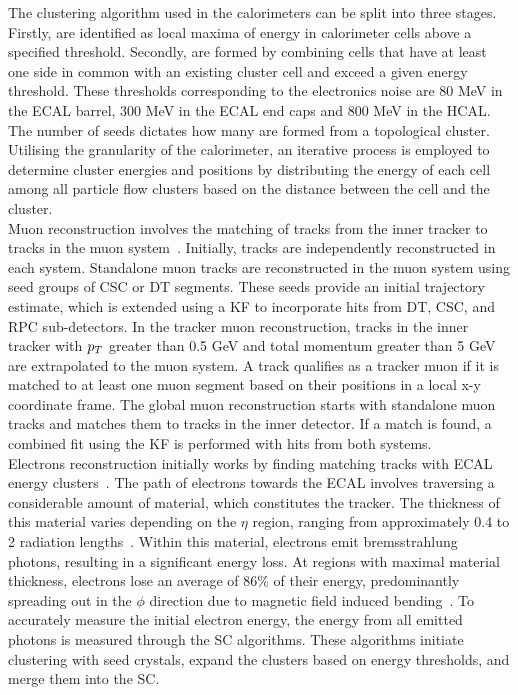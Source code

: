 The clustering algorithm used in the calorimeters can be split into three stages. 
Firstly,  are identified as local maxima of energy in calorimeter cells above a specified threshold. 
Secondly,  are formed by combining cells that have at least one side in common with an existing cluster cell and exceed a given energy threshold. 
These thresholds corresponding to the electronics noise are 80 MeV in the \ac{ECAL} barrel, 300 MeV in the \ac{ECAL} end caps and 800 MeV in the \ac{HCAL}. 
The number of seeds dictates how many  are formed from a topological cluster.
Utilising the granularity of the calorimeter, an iterative process is employed to determine cluster energies and positions by distributing the energy of each cell among all particle flow clusters based on the distance between the cell and the cluster. \\

Muon reconstruction involves the matching of tracks from the inner tracker to tracks in the muon system~\cite{CMS:2012nsv,CMS:2018rym}.
Initially, tracks are independently reconstructed in each system. 
Standalone muon tracks are reconstructed in the muon system using seed groups of \ac{CSC} or \ac{DT} segments. 
These seeds provide an initial trajectory estimate, which is extended using a \ac{KF} to incorporate hits from \ac{DT}, \ac{CSC}, and \ac{RPC} sub-detectors. 
In the tracker muon reconstruction, tracks in the inner tracker with $p_{T}$ greater than 0.5 GeV and total momentum greater than 5 GeV are extrapolated to the muon system. 
A track qualifies as a tracker muon if it is matched to at least one muon segment based on their positions in a local x-y coordinate frame. 
The global muon reconstruction starts with standalone muon tracks and matches them to tracks in the inner detector. 
If a match is found, a combined fit using the \ac{KF} is performed with hits from both systems. \\

Electrons reconstruction initially works by finding matching tracks with \ac{ECAL} energy clusters~\cite{CMS:2015xaf}.
The path of electrons towards the \ac{ECAL} involves traversing a considerable amount of material, which constitutes the tracker. 
The thickness of this material varies depending on the $\eta$ region, ranging from approximately 0.4 to 2 radiation lengths~\cite{CMS:2015xaf}. 
Within this material, electrons emit bremsstrahlung photons, resulting in a significant energy loss. 
At regions with maximal material thickness, electrons lose an average of 86\% of their energy, predominantly spreading out in the $\phi$ direction due to magnetic field induced bending~\cite{CMS:2015xaf}. 
To accurately measure the initial electron energy, the energy from all emitted photons is measured through the \ac{SC} algorithms. 
These algorithms initiate clustering with seed crystals, expand the clusters based on energy thresholds, and merge them into the \ac{SC}. \\

